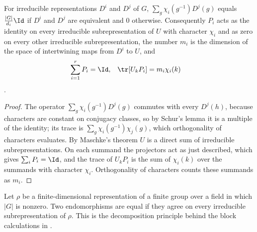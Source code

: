 \begin{lemma}%
    \label{thm:peps_isotypic_projectors}
    \leanok
    For irreducible representations $D^i$ and $D^j$ of $G$,
    $\sum_g\chi_i(g^{-1})D^j(g)$ equals $\frac{|G|}{d_i}\Id$ if $D^i$
    and $D^j$ are equivalent and $0$ otherwise. Consequently $P_i$ acts as
    the identity on every irreducible subrepresentation of $U$ with
    character $\chi_i$ and as zero on every other irreducible
    subrepresentation, the number $m_i$ is the dimension of the space of
    intertwining maps from $D^i$ to $U$, and
    \begin{align*}
        \sum_{i=1}^{r}P_i & =\Id, & \tr[U_kP_i] & =m_i\chi_i(k)
    \end{align*}
    \cite[Lemma~4.4]{Schuch2010PEPS}.
\end{lemma}

\begin{proof}\leanok
    The operator $\sum_g\chi_i(g^{-1})D^j(g)$ commutes with every $D^j(h)$,
    because characters are constant on conjugacy classes, so by Schur's lemma
    it is a multiple of the identity; its trace is
    $\sum_g\chi_i(g^{-1})\chi_j(g)$, which orthogonality of characters
    evaluates. By Maschke's theorem $U$ is a direct sum of irreducible
    subrepresentations. On each summand the projectors act as just
    described, which gives $\sum_iP_i=\Id$, and the trace of
    $U_kP_i$ is the sum of $\chi_i(k)$ over the summands with character
    $\chi_i$. Orthogonality of characters counts these summands as $m_i$.
\end{proof}

\begin{lemma}
    \label{thm:peps_irreducible_ext}
    \leanok
    Let $\rho$ be a finite-dimensional representation of a finite group
    over a field in which $|G|$ is nonzero. Two endomorphisms are equal
    if they agree on every irreducible subrepresentation of $\rho$.
    This is the decomposition principle behind the block calculations
    in \cite[Lemma~4.4]{Schuch2010PEPS}.
\end{lemma}

